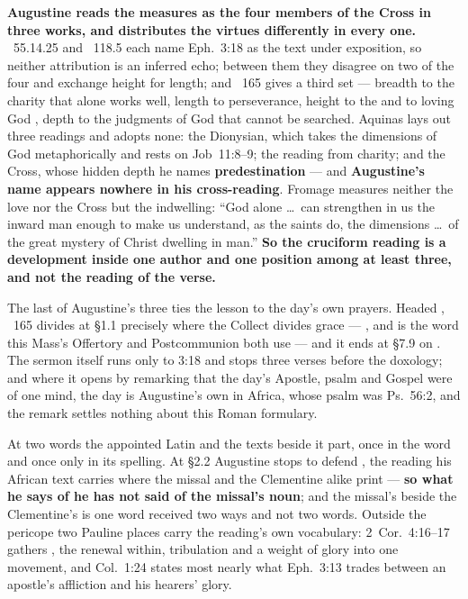 \textbf{Augustine reads the measures as the four members of the Cross in three
works, and distributes the virtues differently in every one.}
~55.14.25 and ~118.5 each
name Eph.~3:18 as the text under exposition, so neither attribution is an
inferred echo; between them they disagree on two of the four and exchange height
for length; and ~165 gives a third set --- breadth to the charity
that alone works well, length to perseverance, height to the  and to loving God , depth to the judgments of God that cannot
be searched. Aquinas lays out three readings and adopts none: the Dionysian,
which takes the dimensions of God metaphorically and rests on Job~11:8--9; the
reading from charity; and the Cross, whose hidden depth he names
\textbf{predestination} --- and \textbf{Augustine's name appears nowhere in his
cross-reading}. Fromage measures neither the love nor the Cross but the
indwelling: ``God alone \dots\ can strengthen in us the inward man enough to make
us understand, as the saints do, the dimensions \dots\ of the great mystery of
Christ dwelling in man.'' \textbf{So the cruciform reading is a development
inside one author and one position among at least three, and not the reading of
the verse.}

The last of Augustine's three ties the lesson to the day's own prayers. Headed
, ~165
divides at \S1.1 precisely where the Collect divides grace ---
, and  is the word this Mass's Offertory and
Postcommunion both use --- and it ends at \S7.9 on . The sermon itself runs only to 3:18 and stops three verses before
the doxology; and where it opens by remarking that the day's Apostle, psalm and
Gospel were of one mind, the day is Augustine's own in Africa, whose psalm was
Ps.~56:2, and the remark settles nothing about this Roman formulary.

At two words the appointed Latin and the texts beside it part, once in the word
and once only in its spelling. At \S2.2
Augustine stops to defend , the reading his African text carries
where the missal and the Clementine alike print  ---
\textbf{so what he says of  he has not said of the missal's
noun}; and the missal's  beside the Clementine's
 is one word received two ways and not two words. Outside the
pericope two Pauline places carry the reading's own vocabulary:
2~Cor.~4:16--17 gathers , the renewal within, tribulation
and a weight of glory into one movement, and Col.~1:24 states most nearly what
Eph.~3:13 trades between an apostle's affliction and his hearers' glory.

